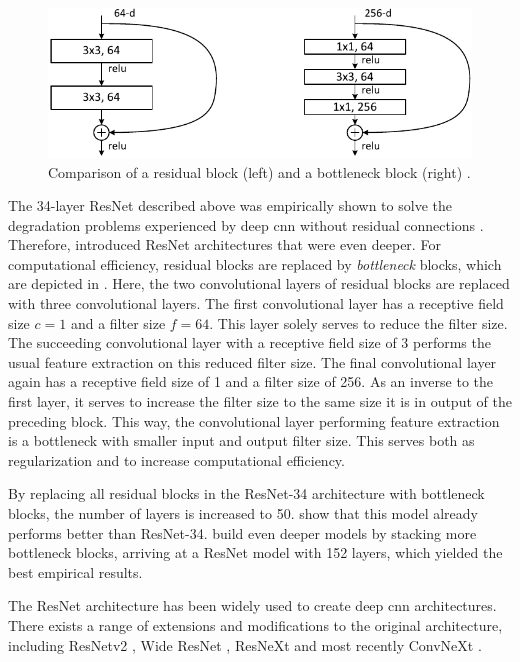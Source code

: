 \begin{figure}
    \centering
    \includegraphics{graphics/block_deeper.pdf}
    \caption{Comparison of a residual block (left) and a bottleneck block (right) \citep{DBLP:conf/cvpr/HeZRS16}.}
    \label{fig:bottleneck}
\end{figure}

The 34-layer ResNet described above was empirically shown to solve the degradation problems experienced by deep \gls{cnn} without residual connections \citep{DBLP:conf/cvpr/HeZRS16}. Therefore, \citet{DBLP:conf/cvpr/HeZRS16} introduced ResNet architectures that were even deeper. For computational efficiency, residual blocks are replaced by \emph{bottleneck} blocks, which are depicted in . Here, the two convolutional layers of residual blocks are replaced with three convolutional layers. The first convolutional layer has a receptive field size $c=1$ and a filter size $f=64$. This layer solely serves to reduce the filter size. The succeeding convolutional layer with a receptive field size of 3 performs the usual feature extraction on this reduced filter size. The final convolutional layer again has a receptive field size of 1 and a filter size of 256. As an inverse to the first layer, it serves to increase the filter size to the same size it is in output of the preceding block. This way, the convolutional layer performing feature extraction is a bottleneck with smaller input and output filter size. This serves both as regularization and to increase computational efficiency.

By replacing all residual blocks in the ResNet-34 architecture with bottleneck blocks, the number of layers is increased to 50. \citet{DBLP:conf/cvpr/HeZRS16} show that this model already performs better than ResNet-34. \citet{DBLP:conf/cvpr/HeZRS16} build even deeper models by stacking more bottleneck blocks, arriving at a ResNet model with 152 layers, which yielded the best empirical results.

The ResNet architecture has been widely used to create deep \gls{cnn} architectures. There exists a range of extensions and modifications to the original architecture, including ResNetv2 \citep{DBLP:conf/eccv/HeZRS16}, Wide ResNet \citep{DBLP:conf/bmvc/ZagoruykoK16}, ResNeXt \citep{DBLP:conf/cvpr/XieGDTH17} and most recently ConvNeXt \citep{DBLP:conf/cvpr/0003MWFDX22}.


